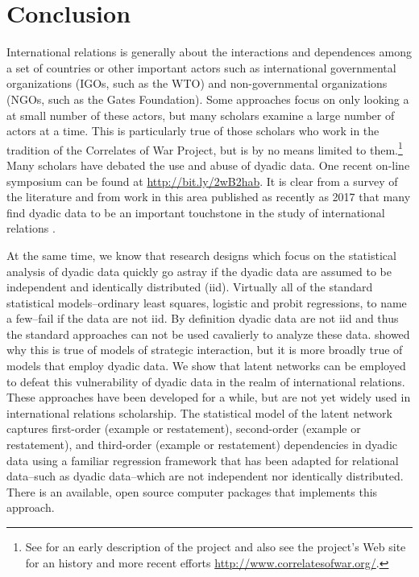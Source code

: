 \section{Conclusion}

International relations is generally about the interactions and dependences among a set of countries or other important actors such as international governmental organizations (IGOs, such as the WTO) and non-governmental organizations (NGOs, such as the Gates Foundation).  Some approaches focus on only looking a at small number of these actors, but many scholars examine a large number of actors at a time. This is particularly true of those scholars who work in the tradition of the Correlates of War Project, but is by no means limited to them.\footnote{See \cite{singer:1972} for an early description of the project and also see the project's Web site for an history and more recent efforts \url{http://www.correlatesofwar.org/}.} Many scholars have debated the use and abuse of dyadic data. One recent on-line symposium can be found at \url{http://bit.ly/2wB2hab}. It is clear from a survey of the literature and from work in this area published as recently as 2017 that many find dyadic data to be an important touchstone in the study of international relations \citet{erikson:pinto:2014,aronow:etal:2015}.

At the same time, we know that research designs which focus on the statistical analysis of dyadic data quickly go astray if the dyadic data are assumed to be independent and identically distributed (iid).  Virtually all of the standard statistical models--ordinary least squares, logistic and probit regressions, to name a few--fail if the data are not iid. By definition dyadic data are not iid and thus the standard approaches can not be used cavalierly to analyze these data.  \citet{signorino:1999} showed why this is true of models of strategic interaction, but it is more broadly true of models that employ dyadic data.  We show that latent networks can be employed to defeat this vulnerability of dyadic data in the realm of international relations. These approaches have been developed for a while, but are not yet widely used in international relations scholarship.  The statistical model of the latent network captures first-order (example or restatement), second-order (example or restatement), and third-order (example or restatement) dependencies in dyadic data using a familiar regression framework that has been adapted for relational data--such as dyadic data--which are not independent nor identically distributed. There is an available, open source computer packages that implements this approach.

